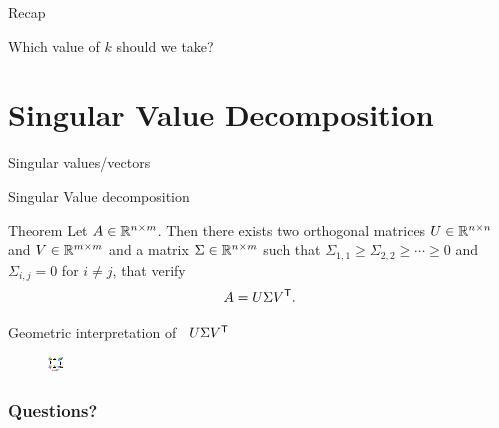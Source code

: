 \documentclass{beamer}
\begin{document}
\begin{frame}[t]{Recap}
	\grid

\end{frame}
\begin{frame}[t]{Which value of $k$ should we take?}
	\grid

	\pause
\end{frame}


\section{Singular Value Decomposition}


\begin{frame}[t]{Singular values/vectors}
	\grid


\end{frame}
\begin{frame}[t]{Singular Value decomposition}
	\grid

	\vspace{-0.3cm}
	\begin{block}{Theorem}
		Let $A \in \mathbb{R}^{n \times m}$. Then there exists two orthogonal matrices $U \in \mathbb{R}^{n \times n}$ and $V \in \mathbb{R}^{m \times m}$ and a matrix $\Sigma \in \mathbb{R}^{n \times m}$ such that $\Sigma_{1,1} \geq \Sigma_{2,2}  \geq \cdots \geq 0$ and $\Sigma_{i,j} = 0$ for $i\neq j$, that verify
		$$
		A = U \Sigma V^{{\sf T}}.
		$$
	\end{block}

\end{frame}

\begin{frame}[t]{Geometric interpretation of \ $U\Sigma V^{{\sf T}}$}
\begin{figure}[H]
	\begin{center}
	\includegraphics[width = 0.6\linewidth]{../figures/svd.pdf}
	\end{center}
\end{figure}

\end{frame}

\appendix
\backupbegin
\begin{frame}[t]
	\frametitle{Questions?}
	\grid

	\pause
\end{frame}
\backupend
\end{document}
